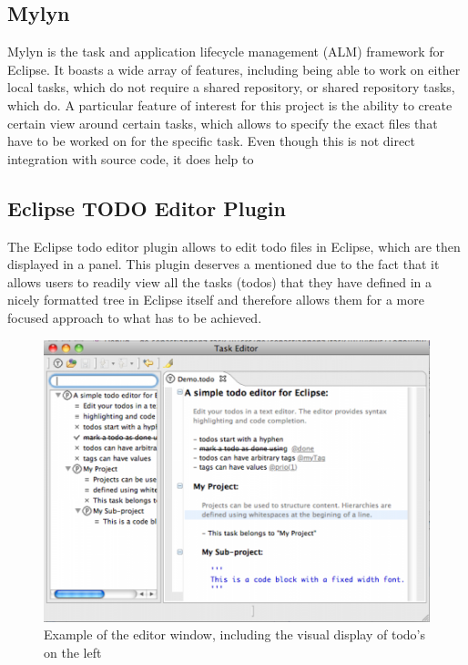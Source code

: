 \documentclass{4thYearProject}
\begin{document}
\subsection{Mylyn}

Mylyn is the task and application lifecycle management (ALM) framework for Eclipse. It boasts a wide array of features, including being able to work on either local tasks, which do not require a shared repository, or shared repository tasks, which do. A particular feature of interest for this project is the ability to create certain view around certain tasks, which allows to specify the exact files that have to be worked on for the specific task. Even though this is not direct integration with source code, it does help to 

\subsection{Eclipse TODO Editor Plugin}

The Eclipse todo editor plugin allows to edit todo files in Eclipse, which are then displayed in a panel. This plugin deserves a mentioned due to the fact that it allows users to readily view all the tasks (todos) that they have defined in a nicely formatted tree in Eclipse itself and therefore allows them for a more focused approach to what has to be achieved. 

\begin{figure}[H]
\includegraphics[scale=0.6]{eclipse_TODO_editor}
\centering
\caption{Example of the editor window, including the visual display of todo's on the left}\label{eclipsetodo}
\label{fig:eclipsetodo}
\end{figure}
\end{document}
